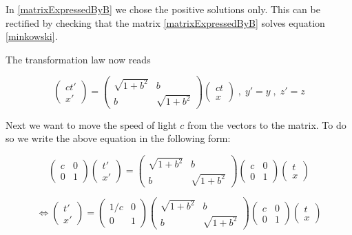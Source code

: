 \documentclass{article}
\begin{document}
In \ref{matrixExpressedByB} we chose the positive solutions only.
This can be rectified by checking that the matrix \ref{matrixExpressedByB} solves equation \ref{minkowski}.

The transformation law now reads

\begin{equation}
\left(\begin{array}{c}
ct'
\\
x'
\end{array} \right)
=
\begin{pmatrix}
\sqrt{1+b^2} & b
\\
b & \sqrt{1+b^2}
\end{pmatrix}
\left(\begin{array}{c}
ct
\\
x
\end{array} \right)
\;,\; y'=y \;,\; z'=z
\end{equation}

Next we want to move the speed of light $c$ from the vectors to the matrix.
To do so we write the above equation in the following form:

\begin{equation}
\begin{pmatrix}
c & 0
\\
0 & 1
\end{pmatrix}
\left(\begin{array}{c}
t'
\\
x'
\end{array} \right)
=
\begin{pmatrix}
\sqrt{1+b^2} & b
\\
b & \sqrt{1+b^2}
\end{pmatrix}
\begin{pmatrix}
c & 0
\\
0 & 1
\end{pmatrix}
\left(\begin{array}{c}
t
\\
x
\end{array} \right)
\end{equation}

\begin{equation}
\iff
\left(\begin{array}{c}
t'
\\
x'
\end{array} \right)
=
\begin{pmatrix}
1/c & 0
\\
0 & 1
\end{pmatrix}
\begin{pmatrix}
\sqrt{1+b^2} & b
\\
b & \sqrt{1+b^2}
\end{pmatrix}
\begin{pmatrix}
c & 0
\\
0 & 1
\end{pmatrix}
\left(\begin{array}{c}
t
\\
x
\end{array} \right)
\end{equation}
\end{document}
